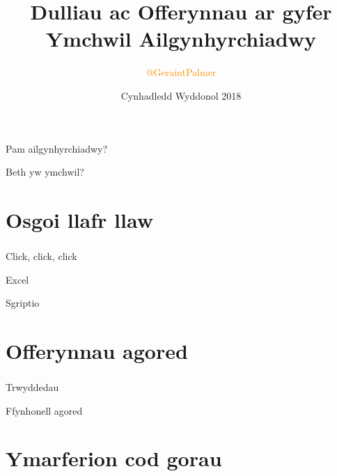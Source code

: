 \documentclass{beamer}
\title{Dulliau ac Offerynnau ar gyfer Ymchwil Ailgynhyrchiadwy}
\author{\textcolor{darkorange}{@GeraintPalmer}}
\date{Cynhadledd Wyddonol 2018}
\begin{document}
\frame{\titlepage}

\begin{frame}
Pam ailgynhyrchiadwy?
\end{frame}

\begin{frame}
Beth yw ymchwil?
\end{frame}

\begin{frame}
\frametitle{\hfill}
\tableofcontents
\end{frame}

\section[]{Osgoi llafr llaw}
\begin{frame}
\frametitle{\hfill}
\end{frame}

\begin{frame}
Click, click, click
\end{frame}

\begin{frame}
Excel
\end{frame}

\begin{frame}
Sgriptio
\end{frame}

\section[]{Offerynnau agored}
\begin{frame}
\frametitle{\hfill}
\end{frame}

\begin{frame}
Trwyddedau
\end{frame}

\begin{frame}
Ffynhonell agored
\end{frame}

\section[]{Ymarferion cod gorau}
\begin{frame}
\frametitle{\hfill}
\end{frame}
\end{document}
